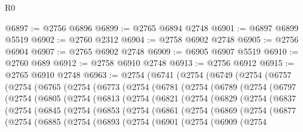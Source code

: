 \begin{lexlean}{R0}
\begin{coremodule}
@6897 := @2756 @6896
@6899 := @2765 @6894 @2748
@6901 := @6897 @6899 @5519
@6902 := @2760 @2312
@6904 := @2758 @6902 @2748
@6905 := @2756 @6904
@6907 := @2765 @6902 @2748
@6909 := @6905 @6907 @5519
@6910 := @2760 @689
@6912 := @2758 @6910 @2748
@6913 := @2756 @6912
@6915 := @2765 @6910 @2748
@6963 := @2754
    (@6741
      (@2754
        (@6749
          (@2754
            (@6757
              (@2754
                (@6765
                  (@2754
                    (@6773
                      (@2754
                        (@6781
                          (@2754
                            (@6789
                              (@2754
                                (@6797
                                  (@2754
                                    (@6805
                                      (@2754
                                        (@6813
                                          (@2754
                                            (@6821
                                              (@2754
                                                (@6829
                                                  (@2754
                                                    (@6837
                                                      (@2754
                                                        (@6845
                                                          (@2754
                                                            (@6853
                                                              (@2754
                                                                (@6861
                                                                  (@2754
                                                                    (@6869
                                                                      (@2754
                                                                        (@6877
                                                                          (@2754
                                                                            (@6885
                                                                              (@2754
                                                                                (@6893
                                                                                  (@2754
                                                                                    (@6901
                                                                                      (@2754
                                                                                        (@6909
                                                                                          (@2754

\end{coremodule}
\end{lexlean}
